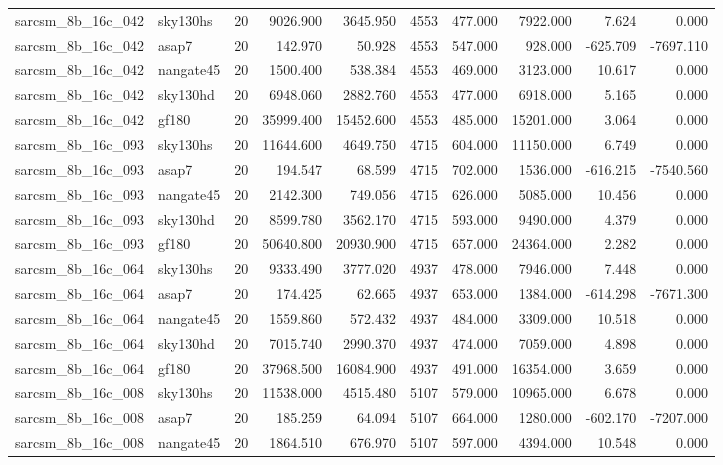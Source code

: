 \begin{tabular}{llrrrrrrrr}
sarcsm\_8b\_16c\_042 & sky130hs & 20 & 9026.900 & 3645.950 & 4553 & 477.000 & 7922.000 & 7.624 & 0.000 \\
sarcsm\_8b\_16c\_042 & asap7 & 20 & 142.970 & 50.928 & 4553 & 547.000 & 928.000 & -625.709 & -7697.110 \\
sarcsm\_8b\_16c\_042 & nangate45 & 20 & 1500.400 & 538.384 & 4553 & 469.000 & 3123.000 & 10.617 & 0.000 \\
sarcsm\_8b\_16c\_042 & sky130hd & 20 & 6948.060 & 2882.760 & 4553 & 477.000 & 6918.000 & 5.165 & 0.000 \\
sarcsm\_8b\_16c\_042 & gf180 & 20 & 35999.400 & 15452.600 & 4553 & 485.000 & 15201.000 & 3.064 & 0.000 \\
sarcsm\_8b\_16c\_093 & sky130hs & 20 & 11644.600 & 4649.750 & 4715 & 604.000 & 11150.000 & 6.749 & 0.000 \\
sarcsm\_8b\_16c\_093 & asap7 & 20 & 194.547 & 68.599 & 4715 & 702.000 & 1536.000 & -616.215 & -7540.560 \\
sarcsm\_8b\_16c\_093 & nangate45 & 20 & 2142.300 & 749.056 & 4715 & 626.000 & 5085.000 & 10.456 & 0.000 \\
sarcsm\_8b\_16c\_093 & sky130hd & 20 & 8599.780 & 3562.170 & 4715 & 593.000 & 9490.000 & 4.379 & 0.000 \\
sarcsm\_8b\_16c\_093 & gf180 & 20 & 50640.800 & 20930.900 & 4715 & 657.000 & 24364.000 & 2.282 & 0.000 \\
sarcsm\_8b\_16c\_064 & sky130hs & 20 & 9333.490 & 3777.020 & 4937 & 478.000 & 7946.000 & 7.448 & 0.000 \\
sarcsm\_8b\_16c\_064 & asap7 & 20 & 174.425 & 62.665 & 4937 & 653.000 & 1384.000 & -614.298 & -7671.300 \\
sarcsm\_8b\_16c\_064 & nangate45 & 20 & 1559.860 & 572.432 & 4937 & 484.000 & 3309.000 & 10.518 & 0.000 \\
sarcsm\_8b\_16c\_064 & sky130hd & 20 & 7015.740 & 2990.370 & 4937 & 474.000 & 7059.000 & 4.898 & 0.000 \\
sarcsm\_8b\_16c\_064 & gf180 & 20 & 37968.500 & 16084.900 & 4937 & 491.000 & 16354.000 & 3.659 & 0.000 \\
sarcsm\_8b\_16c\_008 & sky130hs & 20 & 11538.000 & 4515.480 & 5107 & 579.000 & 10965.000 & 6.678 & 0.000 \\
sarcsm\_8b\_16c\_008 & asap7 & 20 & 185.259 & 64.094 & 5107 & 664.000 & 1280.000 & -602.170 & -7207.000 \\
sarcsm\_8b\_16c\_008 & nangate45 & 20 & 1864.510 & 676.970 & 5107 & 597.000 & 4394.000 & 10.548 & 0.000 \\

\end{tabular}
